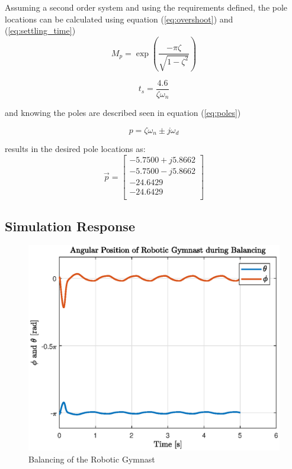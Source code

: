 Assuming a second order system and using the requirements defined, the pole locations can be calculated using equation (\ref{eq:overshoot}) and (\ref{eq:settling_time})
\begin{equation} \label{eq:overshoot}
M_{p} = \exp(\frac{-\pi \zeta}{ \sqrt{1-\zeta^2}})
\end{equation}

\begin{equation} \label{eq:settling_time}
t_{s} = \frac{4.6}{\zeta \omega_{n}}
\end{equation}

and knowing the poles are described seen in equation (\ref{eq:poles}) 

\begin{equation} \label{eq:poles}
p = \zeta \omega_{n} \pm j\omega_{d}
\end{equation}

results in the desired pole locations as:
 $$
 \vec{p} = 
 \begin{bmatrix}
 -5.7500 + j5.8662 \\
 -5.7500 - j5.8662	\\
 -24.6429  \\
 -24.6429  \\
 \end{bmatrix}
 $$


\subsection{Simulation Response}
\begin{figure}[h]
	\centering
	\includegraphics[scale=1]{./figs/balancing}
	\caption{Balancing of the Robotic Gymnast}
	\label{fig:balance}
\end{figure}

